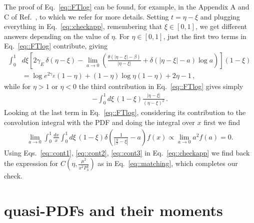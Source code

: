 The proof of Eq.~\eqref{eq::FTlog} can be found, for example, in the Appendix A
and C of Ref.~\cite{Izubuchi:2018srq}, to which we refer for more details.
Setting $t = \eta-\xi $ and plugging everything in Eq.~\eqref{eq::checkapp},
remembering that $\xi \in \left[0,1\right]$, we get different answers depending
on the value of $\eta$. For $\eta \in \left[0,1\right]$, just the first two
terms in Eq.~\eqref{eq::FTlog} contribute, giving
\begin{align}
    \label{eq::cont1}
    \int_0^1 &d\xi \left[2 \gamma_E \, \delta\left(\eta-\xi\right) -
    \lim_{a\rightarrow 0}
    \left(\frac{\theta\left(|\eta-\xi|-\beta\right)}{|\eta-\xi|} +  
    \delta\left(|\eta-\xi|-a\right)\log a\right)\right]
    \left(1-\xi\right) \nonumber \\
    & = \log{e^{2\gamma_E}}\left(1-\eta\right) + 
    \left(1-\eta\right)\log{\eta\left(1-\eta\right)} +2\eta -1\, ,
\end{align}
while for $\eta > 1$ or $\eta < 0$ the third contribution in Eq.~\eqref{eq::FTlog} gives simply
\begin{align}
    \label{eq::cont2}
    -\int_0^1 d\xi\, \left(1-\xi\right)\frac{|\eta-\xi|}{\left(\eta-\xi\right)^2}\, .
\end{align}
Looking at the last term in Eq.~\eqref{eq::FTlog}, considering its contribution
to the convolution integral with the PDF and doing the integral over $x$ first
we find
\begin{align}
    \label{eq::cont3}
    \lim_{a\rightarrow 0}\int_0^1 \frac{dx}{x}\int_0^1 d\xi \,\left(1-\xi\right)
    \delta\left(\frac{1}{|\frac{y}{x}-\xi|} - a\right)f\left(x\right) 
    \propto \lim_{a\rightarrow 0} a^2 f\left(a\right) = 0.
\end{align}
Using Eqs.~\eqref{eq::cont1}, \eqref{eq::cont2}, \eqref{eq::cont3} in
Eq.~\eqref{eq::checkapp} we find back the expression for
$C\left(\eta,\frac{\mu^2}{x^2 P_3^2}\right)$ as in Eq.~\eqref{eq::matching},
which completes our check.

\section{quasi-PDFs and their moments}
\label{app:moments}

